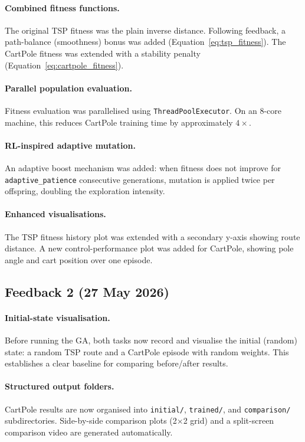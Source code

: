 \documentclass[12pt,a4paper]{article}
\begin{document}
\paragraph{Combined fitness functions.}
The original TSP fitness was the plain inverse distance. Following feedback, a path-balance (smoothness) bonus was added (Equation~\ref{eq:tsp_fitness}). The CartPole fitness was extended with a stability penalty (Equation~\ref{eq:cartpole_fitness}).

\paragraph{Parallel population evaluation.}
Fitness evaluation was parallelised using \texttt{ThreadPoolExecutor}. On an 8-core machine, this reduces CartPole training time by approximately $4\times$.

\paragraph{RL-inspired adaptive mutation.}
An adaptive boost mechanism was added: when fitness does not improve for \texttt{adaptive\_patience} consecutive generations, mutation is applied twice per offspring, doubling the exploration intensity.

\paragraph{Enhanced visualisations.}
The TSP fitness history plot was extended with a secondary y-axis showing route distance. A new control-performance plot was added for CartPole, showing pole angle and cart position over one episode.

\subsection{Feedback 2 (27 May 2026)}

\paragraph{Initial-state visualisation.}
Before running the GA, both tasks now record and visualise the initial (random) state: a random TSP route and a CartPole episode with random weights. This establishes a clear baseline for comparing before/after results.

\paragraph{Structured output folders.}
CartPole results are now organised into \texttt{initial/}, \texttt{trained/}, and \texttt{comparison/} subdirectories. Side-by-side comparison plots (2×2 grid) and a split-screen comparison video are generated automatically.
\end{document}
